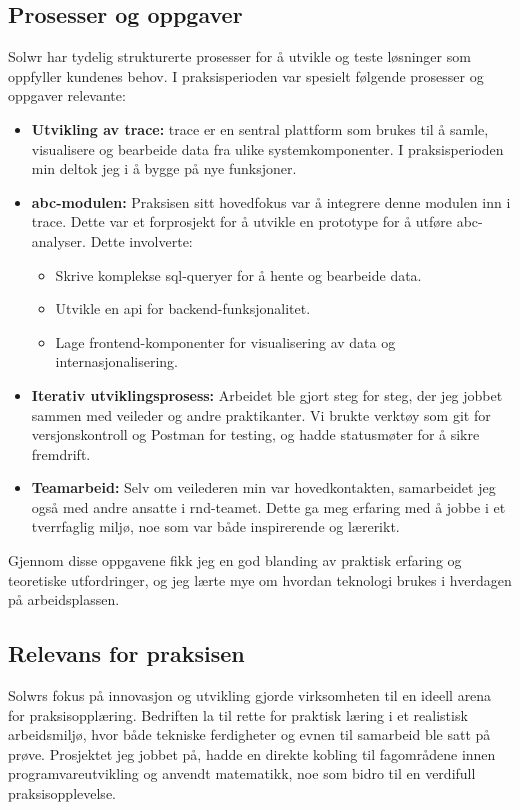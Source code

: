 \subsection{Prosesser og oppgaver}
Solwr har tydelig strukturerte prosesser for å utvikle og teste løsninger som oppfyller kundenes behov. I praksisperioden var spesielt følgende prosesser og oppgaver relevante:
\begin{itemize}
    \item \textbf{Utvikling av \gls{trace}:} \gls{trace} er en sentral plattform som brukes til å samle, visualisere og bearbeide data fra ulike systemkomponenter. I praksisperioden min deltok jeg i å bygge på nye funksjoner.
    \item \textbf{\gls{abc}-modulen:} Praksisen sitt hovedfokus var å integrere denne modulen inn i \gls{trace}. Dette var et forprosjekt for å utvikle en prototype for å utføre \gls{abc}-analyser. Dette involverte:
    \begin{itemize}
        \item Skrive komplekse \gls{sql}-queryer for å hente og bearbeide data.
        \item Utvikle en \gls{api} for backend-funksjonalitet.
        \item Lage frontend-komponenter for visualisering av data og internasjonalisering.
    \end{itemize}
    \item \textbf{Iterativ utviklingsprosess:} Arbeidet ble gjort steg for steg, der jeg jobbet sammen med veileder og andre praktikanter. Vi brukte verktøy som \gls{git} for versjonskontroll og Postman for testing, og hadde statusmøter for å sikre fremdrift.
    \item \textbf{Teamarbeid:} Selv om veilederen min var hovedkontakten, samarbeidet jeg også med andre ansatte i \gls{rnd}-teamet. Dette ga meg erfaring med å jobbe i et tverrfaglig miljø, noe som var både inspirerende og lærerikt.
\end{itemize}
Gjennom disse oppgavene fikk jeg en god blanding av praktisk erfaring og teoretiske utfordringer, og jeg lærte mye om hvordan teknologi brukes i hverdagen på arbeidsplassen.

\subsection{Relevans for praksisen}
Solwrs fokus på innovasjon og utvikling gjorde virksomheten til en ideell arena for praksisopplæring. Bedriften la til rette for praktisk læring i et realistisk arbeidsmiljø, hvor både tekniske ferdigheter og evnen til samarbeid ble satt på prøve. Prosjektet jeg jobbet på, hadde en direkte kobling til fagområdene innen programvareutvikling og anvendt matematikk, noe som bidro til en verdifull praksisopplevelse.